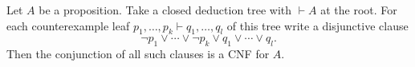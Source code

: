 

\setcounter{section}{2}
\setcounter{subsection}{8}
\setcounter{dfn}{20}

\begin{thm}
Let $A$ be a proposition.
Take a closed deduction tree with $\vdash A$ at the root.
For each counterexample leaf $p_1, \ldots, p_k \vdash q_1, \ldots, q_l$ of this tree write a disjunctive clause
\[
\neg p_1 \vee \cdots \vee \neg p_k \vee q_1 \vee \cdots \vee q_l.
\]
Then the conjunction of all such clauses is a CNF for $A$.
\end{thm}

